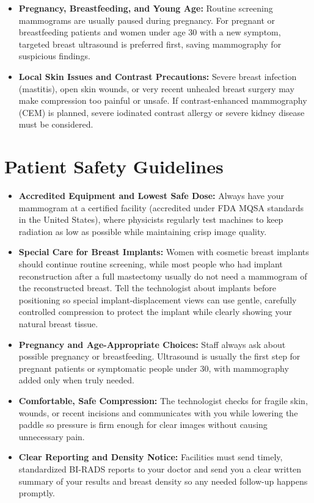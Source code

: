\begin{itemize}
    \item \textbf{Pregnancy, Breastfeeding, and Young Age:} Routine screening mammograms are usually paused during pregnancy. For pregnant or breastfeeding patients and women under age 30 with a new symptom, targeted breast ultrasound is preferred first, saving mammography for suspicious findings.
    \item \textbf{Local Skin Issues and Contrast Precautions:} Severe breast infection (mastitis), open skin wounds, or very recent unhealed breast surgery may make compression too painful or unsafe. If contrast-enhanced mammography (CEM) is planned, severe iodinated contrast allergy or severe kidney disease must be considered.
\end{itemize}

\section{Patient Safety Guidelines}

\begin{itemize}
    \item \textbf{Accredited Equipment and Lowest Safe Dose:} Always have your mammogram at a certified facility (accredited under FDA MQSA standards in the United States), where physicists regularly test machines to keep radiation as low as possible while maintaining crisp image quality.
    \item \textbf{Special Care for Breast Implants:} Women with cosmetic breast implants should continue routine screening, while most people who had implant reconstruction after a full mastectomy usually do not need a mammogram of the reconstructed breast. Tell the technologist about implants before positioning so special implant-displacement views can use gentle, carefully controlled compression to protect the implant while clearly showing your natural breast tissue.
    \item \textbf{Pregnancy and Age-Appropriate Choices:} Staff always ask about possible pregnancy or breastfeeding. Ultrasound is usually the first step for pregnant patients or symptomatic people under 30, with mammography added only when truly needed.
    \item \textbf{Comfortable, Safe Compression:} The technologist checks for fragile skin, wounds, or recent incisions and communicates with you while lowering the paddle so pressure is firm enough for clear images without causing unnecessary pain.
    \item \textbf{Clear Reporting and Density Notice:} Facilities must send timely, standardized BI-RADS reports to your doctor and send you a clear written summary of your results and breast density so any needed follow-up happens promptly.
\end{itemize}


